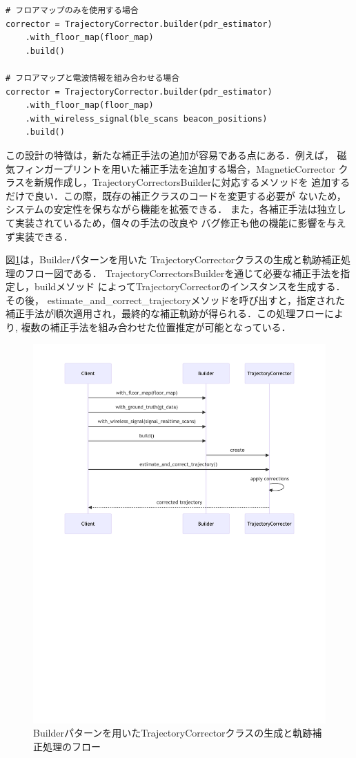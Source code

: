 \begin{lstlisting}[caption={TrajectoryCorrectorの使用例},label=lst:trajectory-corrector,float=h]
# フロアマップのみを使用する場合
corrector = TrajectoryCorrector.builder(pdr_estimator)
    .with_floor_map(floor_map)
    .build()

# フロアマップと電波情報を組み合わせる場合
corrector = TrajectoryCorrector.builder(pdr_estimator)
    .with_floor_map(floor_map)
    .with_wireless_signal(ble_scans beacon_positions)
    .build()
\end{lstlisting}

この設計の特徴は，新たな補正手法の追加が容易である点にある．例えば，
磁気フィンガープリントを用いた補正手法を追加する場合，MagneticCorrector
クラスを新規作成し，TrajectoryCorrectorsBuilderに対応するメソッドを
追加するだけで良い．この際，既存の補正クラスのコードを変更する必要が
ないため，システムの安定性を保ちながら機能を拡張できる．
また，各補正手法は独立して実装されているため，個々の手法の改良や
バグ修正も他の機能に影響を与えず実装できる．

図\ref{fig:corrector-sequence}は，Builderパターンを用いた
TrajectoryCorrectorクラスの生成と軌跡補正処理のフロー図である．
TrajectoryCorrectorsBuilderを通じて必要な補正手法を指定し，buildメソッド
によってTrajectoryCorrectorのインスタンスを生成する．その後，
estimate\_and\_correct\_trajectoryメソッドを呼び出すと，指定された
補正手法が順次適用され，最終的な補正軌跡が得られる．この処理フローにより,
複数の補正手法を組み合わせた位置推定が可能となっている．

\begin{figure}[H]
    \centering
    \includegraphics[width=\linewidth]{../image/corrector-flow-diagram.pdf}
    \caption{Builderパターンを用いたTrajectoryCorrectorクラスの生成と軌跡補正処理のフロー}
    \label{fig:corrector-sequence}
\end{figure}
